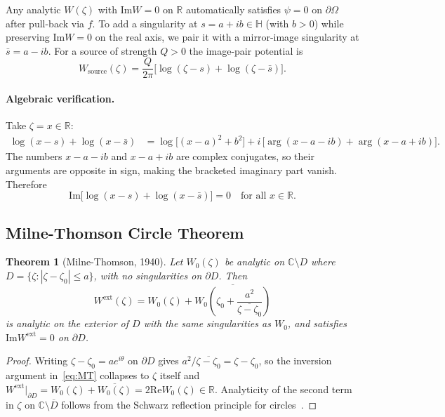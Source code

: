 \documentclass[11pt]{article}
\newcommand{\HH}{\mathbb{H}}
\newcommand{\CC}{\mathbb{C}}
\newcommand{\RR}{\mathbb{R}}
\newcommand{\conj}[1]{\overline{#1}}
\newcommand{\abs}[1]{\left\lvert #1 \right\rvert}
\newcommand{\Imag}{\mathrm{Im}}
\newcommand{\Real}{\mathrm{Re}}
\newtheorem{theorem}{Theorem}
\begin{document}
Any analytic $W(\zeta)$ with $\Imag W = 0$ on $\RR$ automatically satisfies
$\psi = 0$ on $\partial \Omega$ after pull-back via $f$. To add a singularity
at $s = a + ib \in \HH$ (with $b > 0$) while preserving $\Imag W = 0$ on the
real axis, we pair it with a mirror-image singularity at $\bar{s} = a - ib$.
For a source of strength $Q > 0$ the image-pair potential is
\begin{equation}
  W_{\mathrm{source}}(\zeta)
  = \frac{Q}{2\pi} \bigl[ \log(\zeta - s) + \log(\zeta - \bar{s}) \bigr].
  \label{eq:source-pair}
\end{equation}

\paragraph{Algebraic verification.}
Take $\zeta = x \in \RR$:
\begin{align*}
  \log(x - s) + \log(x - \bar{s})
  &= \log\!\bigl[(x - a)^2 + b^2\bigr]
     + i\,\bigl[\arg(x - a - ib) + \arg(x - a + ib)\bigr].
\end{align*}
The numbers $x - a - ib$ and $x - a + ib$ are complex conjugates, so their
arguments are opposite in sign, making the bracketed imaginary part vanish.
Therefore
\begin{equation}
  \Imag\!\bigl[\log(x - s) + \log(x - \bar{s})\bigr] = 0
  \quad \text{for all } x \in \RR.
  \label{eq:imsum}
\end{equation}

\subsection{Milne-Thomson Circle Theorem}
\label{sec:MT}

\begin{theorem}[Milne-Thomson, 1940]
\label{thm:MT}
Let $W_0(\zeta)$ be analytic on $\CC \setminus D$ where
$D = \{\zeta : \abs{\zeta - \zeta_0} \leq a\}$, with no singularities on
$\partial D$. Then
\begin{equation}
  W^{\mathrm{ext}}(\zeta) = W_0(\zeta)
  + \conj{W_0\!\left(\zeta_0 + \frac{a^2}{\conj{\zeta - \zeta_0}}\right)}
  \label{eq:MT}
\end{equation}
is analytic on the exterior of $D$ with the same singularities as $W_0$, and
satisfies $\Imag W^{\mathrm{ext}} = 0$ on $\partial D$.
\end{theorem}

\begin{proof}
Writing $\zeta - \zeta_0 = a e^{i\theta}$ on $\partial D$ gives
$a^2/\conj{\zeta - \zeta_0} = \zeta - \zeta_0$, so the inversion argument
in~\eqref{eq:MT} collapses to $\zeta$ itself and
$W^{\mathrm{ext}}|_{\partial D} = W_0(\zeta) + \conj{W_0(\zeta)} = 2\Real W_0(\zeta) \in \RR$.
Analyticity of the second term in $\zeta$ on $\CC \setminus \overline{D}$
follows from the Schwarz reflection principle for
circles~\citep[Ch.~4, \S6.5]{Ahlfors79}.
\end{proof}
\end{document}
